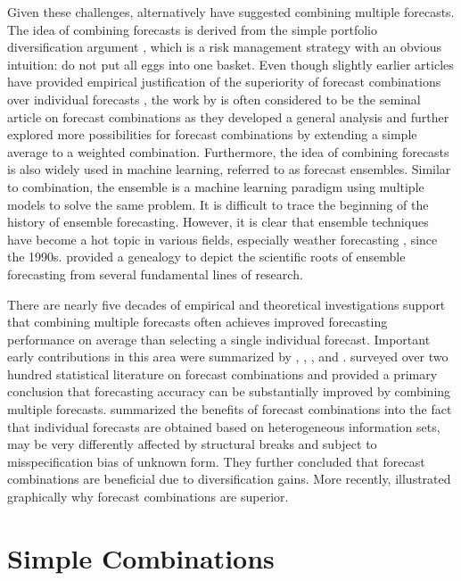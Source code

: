 \documentclass[11pt]{article}
\begin{document}
Given these challenges, alternatively \cite{Bates1969-yj} have suggested combining multiple forecasts. The idea of combining forecasts is derived from the simple portfolio diversification argument \citep{Timmermann2006-en}, which is a risk management strategy with an obvious intuition: do not put all eggs into one basket. Even though slightly earlier articles have provided empirical justification of the superiority of forecast combinations over individual forecasts \citep[e.g.,][]{Barnard1963-xa,crane1967two}, the work by \cite{Bates1969-yj} is often considered to be the seminal article on forecast combinations as they developed a general analysis and further explored more possibilities for forecast combinations by extending a simple average to a weighted combination. Furthermore, the idea of combining forecasts is also widely used in machine learning, referred to as forecast ensembles. Similar to combination, the ensemble is a machine learning paradigm using multiple models to solve the same problem. It is difficult to trace the beginning of the history of ensemble forecasting. However, it is clear that ensemble techniques have become a hot topic in various fields, especially weather forecasting \cite[see an overview by][]{Leutbecher2008-mc}, since the 1990s. \cite{Lewis2005-hu} provided a genealogy to depict the scientific roots of ensemble forecasting from several fundamental lines of research. 

There are nearly five decades of empirical and theoretical investigations support that combining multiple forecasts often achieves improved forecasting performance on average than selecting a single individual forecast. Important early contributions in this area were summarized by \cite{Granger1989-gv}, \cite{Clemen1989-fb}, \cite{Palm1992-im}, and \cite{Timmermann2006-en}. \cite{Clemen1989-fb} surveyed over two hundred statistical literature on forecast combinations and provided a primary conclusion that forecasting accuracy can be substantially improved by combining multiple forecasts. \cite{Timmermann2006-en} summarized the benefits of forecast combinations into the fact that individual forecasts are obtained based on heterogeneous information sets, may be very differently affected by structural breaks and subject to misspecification bias of unknown form. They further concluded that forecast combinations are beneficial due to diversification gains. More recently, \cite{Atiya2020-ge} illustrated graphically why forecast combinations are superior.


\section{Simple Combinations}
\end{document}
